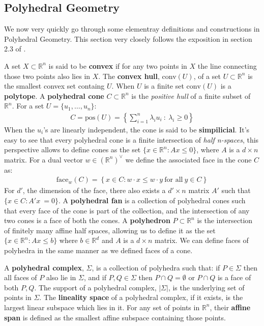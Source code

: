     \subsection{Polyhedral Geometry}
We now very quickly go through some elementray definitions and constructions in Polyhedral Geometry. 
This section very closely follows the exposition in section 2.3 of \cite{maclagan2015introduction}.
   \par A set $X\subset \mathbb{R}^{n}$ is said to be \textbf{convex} if for any two points in $X$ the line connecting those two points also lies in $X$. 
   The \textbf{convex hull}, conv$(U)$, of a set $U\subset \mathbb{R}^{n}$ is the smallest convex set containg $U$.
   When $U$ is a finite set $\text{conv}(U)$ is a \textbf{polytope}. 
   A \textbf{polyhedral cone} $C \subset \mathbb{R}^{n}$ is the \textit{positive hull} of a finite subset of $\mathbb{R}^{n}$. 
   For a set $U = \{u_1,\dots,u_n\}$:
   \begin{align*}
       C = \text{pos}(U) = \left\{\sum_{i=1}^{n}\lambda_i u_i~:~\lambda_i\geq 0\right\}
   \end{align*}
   When the $u_i$'s are linearly independent, the cone is said to be \textbf{simpilicial}. 
    It's easy to see that every polyhedral cone is a finite intersection of \textit{half n-spaces}, this perspective allows to define cones as the set $\{x \in \mathbb{R}^{n}: Ax\leq 0\}$, where $A$ is a $d \times n$ matrix. 
    For a dual vector $w \in (\mathbb{R}^{n})^{\vee}$ we define the associated face in the cone $C$ as:
    \begin{align*}
        \text{face}_{w}(C) = \left\{x \in C: w\cdot x \leq w\cdot y ~\text{for all}~y \in C\right\}
    \end{align*}
    For $d'$, the dimension of the face, there also exists a $d'\times n$ matrix $A'$ such that $\{x \in C: A'x\ =  0\}$. 
    A \textbf{polyhedral fan} is a collection of polyhedral cones such that every face of the cone is part of the collection, and the intersection of any two cones is a face of both the cones.
    A \textbf{polyhedron} $P \subset \mathbb{R}^{n}$ is the intersection of finitely many affine half spaces, allowing us to define it as the set $\{x \in \mathbb{R}^{n}: Ax\leq b\}$ where $b \in \mathbb{R}^{d}$ and $A$ is a $d \times n$ matrix. We can define faces of polyhedra in the same manner as we defined faces of a cone.
    \par A \textbf{polyhedral complex}, $\Sigma$, is a collection of polyhedra such that: if $P \in \Sigma$ then all faces of $P$ also lie in $\Sigma$, and if $P,Q \in \Sigma$ then $P \cap Q = \emptyset$ or $P \cap Q$ is a face of both $P,Q$. The support of a polyhedral complex, $|\Sigma |$, is the underlying set of points in $\Sigma$. 
    The \textbf{lineality space} of a polyhedral complex, if it exists, is the largest linear subspace which lies in it.
    For any set of points in $\mathbb{R}^{n}$, their \textbf{affine span} is defined as the smallest affine subspace containing those points.


